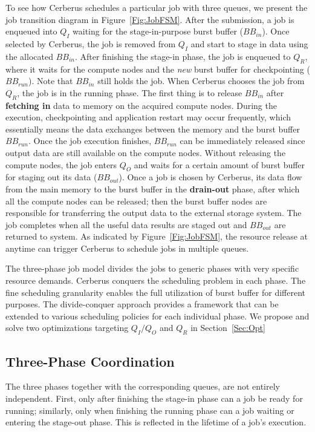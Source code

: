 To see how Cerberus schedules a particular job with three queues,
we present the job transition diagram in Figure~\ref{Fig:JobFSM}.
After the submission, a job is enqueued into $Q_I$ waiting for the stage-in-purpose burst buffer ($BB_{in}$).
Once selected by Cerberus, the job is removed from $Q_I$ and start to stage in data using the allocated $BB_{in}$.
After finishing the stage-in phase, the job is enqueued to $Q_R$,
where it waits for the compute nodes and the \textit{new} burst buffer for checkpointing ($BB_{run}$).
Note that $BB_{in}$ still holds the job. When Cerberus chooses the job from $Q_R$, the job is in the running phase.
The first thing is to release $BB_{in}$ after \textbf{fetching in} data to memory on the acquired compute nodes.
During the execution, checkpointing and application restart may occur frequently,
which essentially means the data exchanges between the memory and the burst buffer $BB_{run}$.
Once the job execution finishes, $BB_{run}$ can be immediately released since
output data are still available on the compute nodes.
Without releasing the compute nodes, the job enters $Q_O$ and waits for a certain amount of burst buffer for staging out its data ($BB_{out}$).
Once a job is chosen by Cerberus, its data flow from the main memory to the burst buffer
in the \textbf{drain-out} phase, after which all the compute nodes can be released;
then the burst buffer nodes are responsible for transferring the output data to the external storage system.
The job completes when all the useful data results are staged out and $BB_{out}$ are returned to system.
As indicated by Figure~\ref{Fig:JobFSM}, the resource release at anytime can trigger Cerberus
to schedule jobs in multiple queues.

The three-phase job model divides the jobs to generic phases with very specific resource demands.
Cerberus conquers the scheduling problem in each phase.
The fine scheduling granularity enables the full utilization of burst buffer for different purposes.
The divide-conquer approach provides a framework that can be extended to various scheduling
policies for each individual phase.
We propose and solve two optimizations targeting $Q_I/Q_O$ and $Q_R$ in Section~\ref{Sec:Opt}

\subsection{Three-Phase Coordination}
The three phases together with the corresponding queues, are not entirely independent.
First, only after finishing the stage-in phase can a job be ready for running;
similarly, only when finishing the running phase can a job waiting or entering the stage-out phase.
This is reflected in the lifetime of a job's execution.

